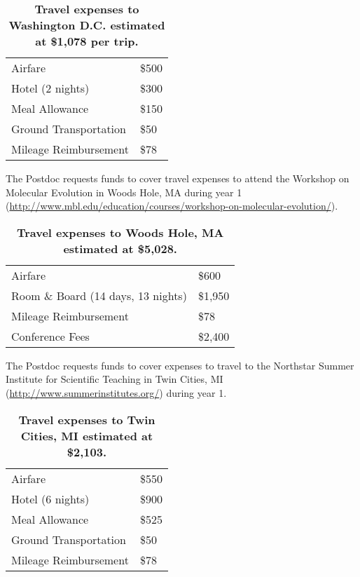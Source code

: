 \documentclass[12pt,letterpaper]{article}
\begin{document}

\begin{table}[h!]
\centering
\begin{tabular}{ll}
\hline

	Airfare	& \$500 \\
	Hotel (2 nights) 	& \$300  \\
	Meal Allowance 	& \$150  \\
	Ground Transportation 	  & \$50 \\
	Mileage Reimbursement	& \$78 \\\hline
\end{tabular}
\caption{\textbf{Travel expenses to Washington D.C. estimated at \$1,078 per trip.}}
\end{table}

The Postdoc requests funds to cover travel expenses to attend the Workshop on Molecular Evolution in Woods Hole, MA during year 1\\
(\url{http://www.mbl.edu/education/courses/workshop-on-molecular-evolution/}).




\begin{table}[h!]
\centering
\begin{tabular}{ll}
\hline

	Airfare	& \$600 \\
	Room \& Board (14 days, 13 nights)	& \$1,950 \\
	Mileage Reimbursement	& \$78 \\
	Conference Fees			& \$2,400 \\\hline
\end{tabular}
\caption{\textbf{Travel expenses to Woods Hole, MA estimated at \$5,028.}}
\end{table}

\newpage

The Postdoc requests funds to cover expenses to travel to the Northstar Summer Institute for Scientific Teaching in Twin Cities, MI (\url{http://www.summerinstitutes.org/}) during year 1.




\begin{table}[h!]
\centering
\begin{tabular}{ll}
\hline
	Airfare	& \$550 \\
	Hotel (6 nights) 	& \$900 \\
	Meal Allowance	& \$525 \\
	Ground Transportation	& \$50 \\
	Mileage Reimbursement	& \$78 \\\hline
\end{tabular}
\caption{\textbf{Travel expenses to Twin Cities, MI estimated at \$2,103.}}
\end{table}
\end{document}
